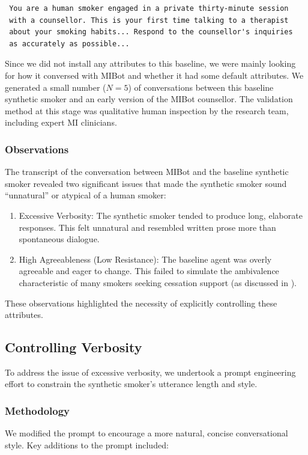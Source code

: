 \begin{verbatim}
 You are a human smoker engaged in a private thirty-minute session
 with a counsellor. This is your first time talking to a therapist
 about your smoking habits... Respond to the counsellor's inquiries
 as accurately as possible...
\end{verbatim}

Since we did not install any attributes to this baseline, we were mainly looking for
how it conversed with MIBot and whether it had some default attributes. We generated a
small number ($N=5$) of conversations between this baseline synthetic smoker and an
early version of the MIBot counsellor. The validation method at this stage was
qualitative human inspection by the research team, including expert MI clinicians.

\subsubsection{Observations}
The transcript of the conversation between MIBot and the baseline synthetic smoker
revealed two significant issues that made the synthetic smoker sound ``unnatural'' or
atypical of a human smoker:

\begin{enumerate}
	\item Excessive Verbosity: The synthetic smoker tended to produce long, elaborate responses.
	      This felt unnatural and resembled written prose more than spontaneous dialogue.
	\item High Agreeableness (Low Resistance): The baseline agent was overly agreeable and eager
	      to change. This failed to simulate the ambivalence characteristic of many smokers
	      seeking cessation support (as discussed in ).
\end{enumerate}

These observations highlighted the necessity of explicitly controlling these
attributes.

\subsection{Controlling Verbosity}
\label{sec:synthetic-smoker-verbosity}

To address the issue of excessive verbosity, we undertook a prompt engineering effort
to constrain the synthetic smoker's utterance length and style.

\subsubsection{Methodology}
We modified the prompt to encourage a more natural, concise conversational style. Key
additions to the prompt included:

